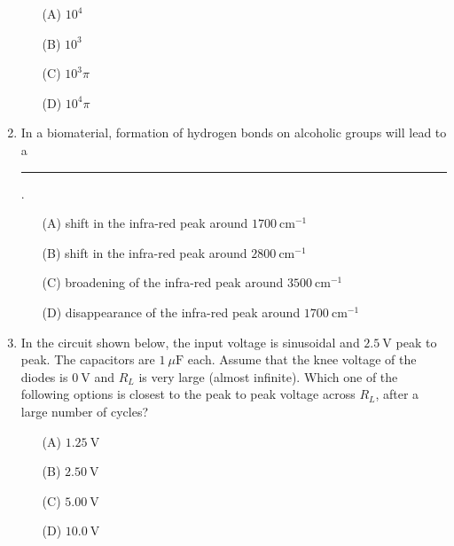 \documentclass[journal]{IEEEtran}
\begin{document}
\begin{enumerate}
\begin{itemize}
    \item[(A)] \(10^4\)
    \item[(B)] \(10^3\)
    \item[(C)] \(10^3\pi\)
    \item[(D)] \(10^4\pi\)
\end{itemize}


\item  
In a biomaterial, formation of hydrogen bonds on alcoholic groups will lead to a \rule{3cm}{0.15mm}.
\hfill{}
\begin{itemize}
    \item[(A)] shift in the infra-red peak around \(1700~\text{cm}^{-1}\)
    \item[(B)] shift in the infra-red peak around \(2800~\text{cm}^{-1}\)
    \item[(C)] broadening of the infra-red peak around \(3500~\text{cm}^{-1}\)
    \item[(D)] disappearance of the infra-red peak around \(1700~\text{cm}^{-1}\)
\end{itemize}


\item  
In the circuit shown below, the input voltage is sinusoidal and \(2.5~\text{V}\) peak to peak. The capacitors are \(1~\mu\text{F}\) each. Assume that the knee voltage of the diodes is \(0~\text{V}\) and \(R_L\) is very large (almost infinite). Which one of the following options is closest to the peak to peak voltage across \(R_L\), after a large number of cycles?

\begin{figure}[H]
\centering
{}%

\label{fig:my_label}
\end{figure}
\begin{itemize}
    \item[(A)] \(1.25~\text{V}\)
    \item[(B)] \(2.50~\text{V}\)
    \item[(C)] \(5.00~\text{V}\)
    \item[(D)] \(10.0~\text{V}\)
\end{itemize}
\hfill{}


\end{enumerate}
\end{document}
